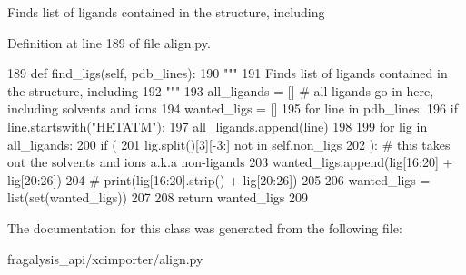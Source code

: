 \begin{DoxyVerb}Finds list of ligands contained in the structure, including
\end{DoxyVerb}
 

Definition at line 189 of file align.\+py.


\begin{DoxyCode}
189     \textcolor{keyword}{def }find\_ligs(self, pdb\_lines):
190         \textcolor{stringliteral}{"""}
191 \textcolor{stringliteral}{        Finds list of ligands contained in the structure, including}
192 \textcolor{stringliteral}{        """}
193         all\_ligands = []  \textcolor{comment}{# all ligands go in here, including solvents and ions}
194         wanted\_ligs = []
195         \textcolor{keywordflow}{for} line \textcolor{keywordflow}{in} pdb\_lines:
196             \textcolor{keywordflow}{if} line.startswith(\textcolor{stringliteral}{"HETATM"}):
197                 all\_ligands.append(line)
198 
199         \textcolor{keywordflow}{for} lig \textcolor{keywordflow}{in} all\_ligands:
200             \textcolor{keywordflow}{if} (
201                     lig.split()[3][-3:] \textcolor{keywordflow}{not} \textcolor{keywordflow}{in} self.non\_ligs
202             ):  \textcolor{comment}{# this takes out the solvents and ions a.k.a non-ligands}
203                 wanted\_ligs.append(lig[16:20] + lig[20:26])
204                 \textcolor{comment}{# print(lig[16:20].strip() + lig[20:26])}
205 
206         wanted\_ligs = list(set(wanted\_ligs))
207 
208         \textcolor{keywordflow}{return} wanted\_ligs
209 
\end{DoxyCode}


The documentation for this class was generated from the following file\+:\begin{DoxyCompactItemize}
\item 
fragalysis\+\_\+api/xcimporter/align.\+py\end{DoxyCompactItemize}
